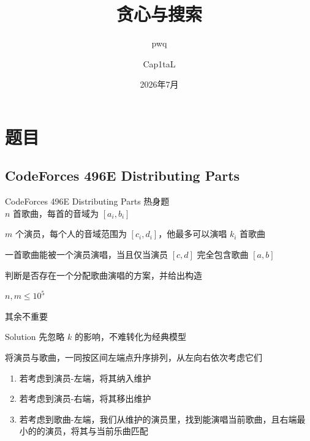 ﻿\documentclass[aspectratio=169,handout]{ctexbeamer}
\author{Cap1taL}
\title{贪心与搜索}
\subtitle{pwq}
\date{2026年7月}
\begin{document}
\kaishu

\begin{frame}
    \titlepage
\end{frame}



\section{题目}


\subsection{CodeForces 496E Distributing Parts}
\begin{frame}{CodeForces 496E Distributing Parts}
    热身题 \\

    $n$ 首歌曲，每首的音域为 $[a_i,b_i]$

    $m$ 个演员，每个人的音域范围为 $[c_i,d_i]$，他最多可以演唱 $k_i$ 首歌曲

    一首歌曲能被一个演员演唱，当且仅当演员 $[c,d]$ 完全包含歌曲 $[a,b]$
    
    判断是否存在一个分配歌曲演唱的方案，并给出构造

    $n,m\leq 10^5$

    其余不重要
\end{frame}

\begin{frame}{Solution}
    先忽略 $k$ 的影响，不难转化为经典模型
    \pause 

    将演员与歌曲，一同按区间左端点升序排列，从左向右依次考虑它们
    \pause 
    
    \begin{enumerate}
        \item 若考虑到演员-左端，将其纳入维护
        \item 若考虑到演员-右端，将其移出维护
        \item 若考虑到歌曲-左端，我们从维护的演员里，找到\textcolor{peaking}{能演唱}当前歌曲，且\textcolor{peaking}{右端最小}的的演员，将其与当前乐曲匹配
    \end{enumerate}
\end{frame}
\end{document}
